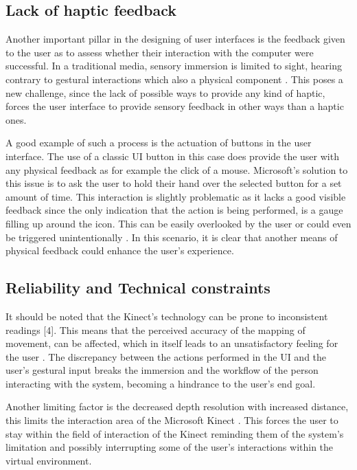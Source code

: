 \documentclass{sigchi}
\begin{document}
\subsection{Lack of haptic feedback}
Another important pillar in the designing of user interfaces is the feedback given to the user as to assess whether their interaction with the computer were successful. In a traditional media, sensory immersion is limited to sight, hearing contrary to gestural interactions which also a physical component \cite{Pasch2009}. This poses a new challenge, since the lack of possible ways to provide any kind of haptic, forces the user interface to provide sensory feedback in other ways than a haptic ones.

A good example of such a process is the actuation of buttons in the user interface. The use of a classic UI button in this case does provide the user with any physical feedback as for example the click of a mouse. Microsoft’s solution to this issue is to ask the user to hold their hand over the selected button for a set amount of time. This interaction is slightly problematic as it lacks a good visible feedback since the only indication that the action is being performed, is a gauge filling up around the icon. This can be easily overlooked by the user or could even be triggered unintentionally \cite{Nielsen}.
In this scenario, it is clear that another means of physical feedback could enhance the user’s experience. 

\subsection{Reliability and Technical constraints}
It should be noted that the Kinect’s technology can be prone to inconsistent readings [4]. This means that the perceived accuracy of the mapping of movement, can be affected, which in itself leads to an unsatisfactory feeling for the user \cite{Pasch2009}. The discrepancy between the actions performed in the UI and the user’s gestural input breaks the immersion and the workflow of the person interacting with the system, becoming a hindrance to the user’s end goal.

Another limiting factor is the decreased depth resolution with increased distance, this limits the interaction area of the Microsoft Kinect \cite{Andersen2012}. This forces the user to stay within the field of interaction of the Kinect reminding them of the system's limitation and possibly interrupting some of the user's interactions within the virtual environment. 
\end{document}
